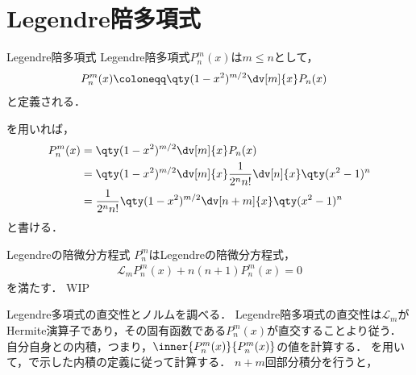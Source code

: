 \documentclass{report}
\begin{document}
    \section{Legendre陪多項式}
      \begin{mydef}{Legendre陪多項式}{}
        Legendre陪多項式$P_n^m(x)$は$m \leq n$として，
        \begin{align}
          P_n^m(x) &\coloneqq \qty(1 - x^2)^{m/2}\dv[m]{x}P_n(x)
        \end{align}
        と定義される．
      \end{mydef}
      \begin{myrem}{}{}
        を用いれば，
        \begin{align}
          P_n^m(x) &= \qty(1 - x^2)^{m/2}\dv[m]{x}P_n(x) \\ 
          &= \qty(1 - x^2)^{m/2}\dv[m]{x}\frac{1}{2^nn!}\dv[n]{x}\qty(x^2 - 1)^n \\ 
          &= \frac{1}{2^nn!}\qty(1 - x^2)^{m/2}\dv[n + m]{x}\qty(x^2 - 1)^n \label{assos-legendre-polynominal}
      \end{align}
      と書ける．
      \end{myrem}
      \begin{myprop}{Legendreの陪微分方程式}{}
        $P_n^m$はLegendreの陪微分方程式，
        \begin{align}
          \mathcal{L}_mP_n^m(x) + n(n + 1)P_n^m(x) = 0\label{assos-legendre-diff-eq}
        \end{align}
        を満たす．
        \tcblower
        WIP
      \end{myprop}
      Legendre多項式の直交性とノルムを調べる．
      Legendre陪多項式の直交性は$\mathcal{L}_m$がHermite演算子であり，その固有函数である$P_n^m(x)$が直交することより従う．
      自分自身との内積，つまり，$\inner{P_n^m(x)}{P_n^m(x)}$の値を計算する．
      を用いて，で示した内積の定義に従って計算する．
      $n + m$回部分積分を行うと，
\end{document}
